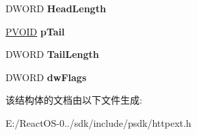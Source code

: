 \begin{DoxyCompactItemize}
D\+W\+O\+RD {\bfseries Head\+Length}
\item 
\mbox{\label{struct___h_s_e___t_f___i_n_f_o_ac5c98b08ad80a3b13a2f8c6619c2c87d}} 
\hyperlink{interfacevoid}{P\+V\+O\+ID} {\bfseries p\+Tail}
\item 
\mbox{\label{struct___h_s_e___t_f___i_n_f_o_a771f894b517e16512c3108641c711887}} 
D\+W\+O\+RD {\bfseries Tail\+Length}
\item 
\mbox{\label{struct___h_s_e___t_f___i_n_f_o_adad4db2376bd9839bfba9143cdd933e4}} 
D\+W\+O\+RD {\bfseries dw\+Flags}
\end{DoxyCompactItemize}


该结构体的文档由以下文件生成\+:\begin{DoxyCompactItemize}
\item 
E\+:/\+React\+O\+S-\/0../sdk/include/psdk/httpext.\+h\end{DoxyCompactItemize}
